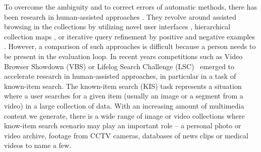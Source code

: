 To overcome the ambiguity and to correct errors of automatic methods, there has been research in human-assisted approaches \cite{VBS2019_overview}. They revolve around assisted browsing in the collections by utilizing novel user interfaces \cite{DuaneGurrin_VirtualReality_LSC2018}, hierarchical collection maps \cite{KlausWikiView}, or iterative query refinement by positive and negative examples \cite{Exquisitor_VBS2020,SOMHunterVBS2020}.
However, a comparison of such approaches is difficult because a person needs to be present in the evaluation loop. In recent years competitions such as Video Browser Showdown (VBS) \cite{VBS2019_overview} or Lifelog Search Challenge (LSC)~\cite{LSC2020} emerged to accelerate research in human-assisted approaches, in particular in a task of known-item search.
The known-item search (KIS) task represents a situation where a user searches for a given item (usually an image or a segment from a video) in a large collection of data.
With an increasing amount of multimedia content we generate, there is a wide range of image or video collections where know-item search scenario may play an important role -- a personal photo or video archive, footage from CCTV cameras, databases of news clips or medical videos to name a few.

